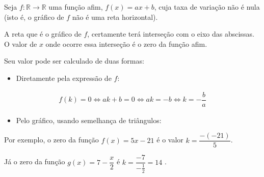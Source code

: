 \begin{observation}{}

Seja \(f:\mathbb{R}\to\mathbb{R}\) uma função afim, \(f(x)=ax+b\), cuja taxa de variação não é nula (isto é, o gráfico de \(f\) não é uma reta horizontal).

A reta que é o gráfico de \(f\), certamente terá interseção com o eixo das abscissas. O valor de \(x\) onde ocorre essa interseção é o zero da função afim.

Seu valor pode ser calculado de duas formas:
\begin{itemize}
\item {} 
Diretamente pela expressão de \(f\):

\end{itemize}
\begin{equation*}
\begin{split}f(k)=0 \Longleftrightarrow ak+b=0 \Longleftrightarrow ak=-b \Longleftrightarrow k=-\dfrac ba\end{split}
\end{equation*}\begin{itemize}
\item {} 
Pelo gráfico, usando semelhança de triângulos:

\end{itemize}

\begin{figure}[H]
\centering

\end{figure}

Por exemplo, o zero da função \(f(x)=5x-21\) é o valor \(k=\dfrac{-(-21)}5\).

Já o zero da função \(g(x)=7-\dfrac x2\) é \(k=\dfrac{-7}{-\frac 12}=14\) .
\end{observation}


